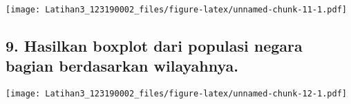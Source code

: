 \documentclass[
]{article}
\newenvironment{Shaded}{\begin{snugshade}}{\end{snugshade}}
\newcommand{\AttributeTok}[1]{\textcolor[rgb]{0.77,0.63,0.00}{#1}}
\newcommand{\DecValTok}[1]{\textcolor[rgb]{0.00,0.00,0.81}{#1}}
\newcommand{\FunctionTok}[1]{\textcolor[rgb]{0.00,0.00,0.00}{#1}}
\newcommand{\NormalTok}[1]{#1}
\newcommand{\OtherTok}[1]{\textcolor[rgb]{0.56,0.35,0.01}{#1}}
\newcommand{\SpecialCharTok}[1]{\textcolor[rgb]{0.00,0.00,0.00}{#1}}
\begin{document}
\begin{Shaded}
\end{Shaded}

\texttt{[image: Latihan3\_123190002\_files/figure-latex/unnamed-chunk-11-1.pdf]}

\hypertarget{hasilkan-boxplot-dari-populasi-negara-bagian-berdasarkan-wilayahnya.}{%
\subsection{9. Hasilkan boxplot dari populasi negara bagian berdasarkan
wilayahnya.}\label{hasilkan-boxplot-dari-populasi-negara-bagian-berdasarkan-wilayahnya.}}

\begin{Shaded}
\end{Shaded}

\texttt{[image: Latihan3\_123190002\_files/figure-latex/unnamed-chunk-12-1.pdf]}
\end{document}
